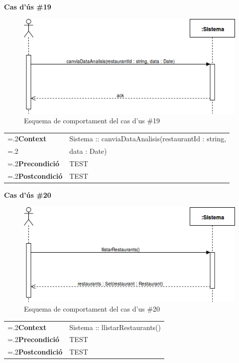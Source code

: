 \clearpage
\noindent\textbf{\large Cas d'ús \#19}\\
\begin{figure}[H]
\centering
\includegraphics[scale=0.6]{Figures/casdus_19.png}
\caption{Esquema de comportament del cas d'us \#19}
\end{figure}
\begin{table}[h]
\noindent
\begin{tabularx}{\linewidth}{
>{\hsize=.2\hsize}X%
>{\hsize=0.8\hsize}X%
}
\textbf{Context} 		& Sistema :: canviaDataAnalisis(restaurantId : string,\\
						& data : Date) \\
\textbf{Precondició} 	& TEST \\
\textbf{Postcondició}	& TEST \\
\end{tabularx}
\label{}
\end{table}

\noindent\textbf{\large Cas d'ús \#20}\\
\begin{figure}[H]
\centering
\includegraphics[scale=0.6]{Figures/casdus_20.png}
\caption{Esquema de comportament del cas d'us \#20}
\end{figure}
\begin{table}[h]
\noindent
\begin{tabularx}{\linewidth}{
>{\hsize=.2\hsize}X%
>{\hsize=0.8\hsize}X%
}
\textbf{Context} 		& Sistema :: llistarRestaurants() \\
\textbf{Precondició} 	& TEST \\
\textbf{Postcondició}	& TEST \\
\end{tabularx}
\label{}
\end{table}

